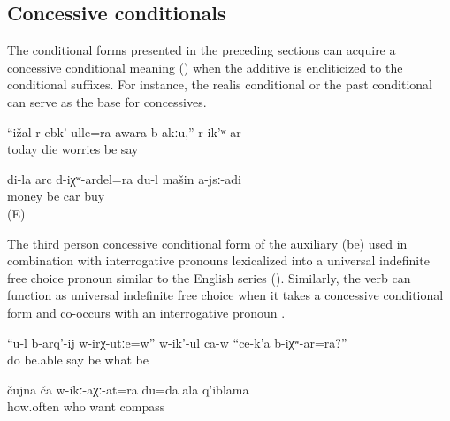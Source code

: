 
\subsection{Concessive conditionals}
\label{sec:concessiveconditionals}

The conditional forms presented in the preceding sections can acquire a concessive conditional meaning () when the additive is encliticized to the conditional suffixes. For instance, the realis conditional  or the past conditional  can serve as the base for concessives.
%
\begin{exe}
	\ex	\label{ex:‎‎‎Even if I die today, I am not worried, she said}
	\gll	``ižal	r-ebk'-ulle=ra	awara	b-akːu,''	r-ik'ʷ-ar\\
		today	die	worries	be	say\\
	\glt	{}

	\ex	\label{ex:‎‎Even if I had money, I would not buy a car}
	\gll	di-la	arc	d-iχʷ-ardel=ra		du-l	mašin	a-jsː-adi\\
			money	be		car	buy\\
	\glt	{} (E)
\end{exe}

The third person concessive conditional form of the auxiliary  (be) used in combination with interrogative pronouns lexicalized into a universal indefinite free choice pronoun similar to the English  series  (). Similarly, the verb   can function as universal indefinite free choice when it takes a concessive conditional form and co-occurs with an interrogative pronoun .
%
\begin{exe}
	\ex	\label{ex:Are you able to do whatever? he says}
	\gll	``u-l	b-arq'-ij	w-irχ-utːe=w''	w-ik'-ul	ca-w	``ce-k'a	b-iχʷ-ar=ra?''\\
			do	be.able	say	be	what		be\\
	\glt	{}

	\ex	\label{ex:How often whoever you love, I am your compass}
	\gll	čujna	ča	w-ikː-aχː-at=ra		du=da	ala	q'iblama\\
		how.often	who	want			compass\\
	\glt	{}
\end{exe}

